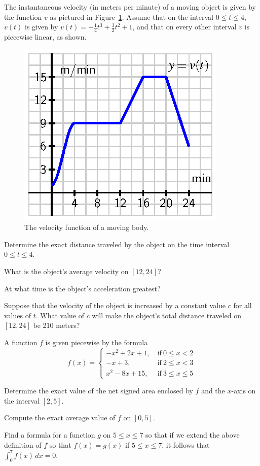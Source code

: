 \begin{exercises} 
  \item The instantaneous velocity (in meters per minute) of a moving object is given by the function $v$ as pictured in Figure~\ref{F:4.4.Ez2}.  Assume that on the interval $0 \le t \le 4$, $v(t)$ is given by $v(t) = -\frac{1}{4}t^3 + \frac{3}{2}t^2 + 1$, and that on every other interval $v$ is piecewise linear, as shown.
  \begin{figure}[h]
\begin{center}
\includegraphics{figures/4_4_Ez2.eps}
\caption{The velocity function of a moving body.} \label{F:4.4.Ez2}
\end{center}
\end{figure} 
  \ba
  	\item Determine the exact distance traveled by the object on the time interval $0 \le t \le 4$.
	\item What is the object's average velocity on $[12,24]$?
	\item At what time is the object's acceleration greatest?
	\item Suppose that the velocity of the object is increased by a constant value $c$ for all values of $t$.  What value of $c$ will make the object's total distance traveled on $[12,24]$ be 210 meters?
  \ea
    \item A function $f$ is given piecewise by the formula
  $$f(x) = \left\{ 
  	\begin{array}{lr}
	-x^2 + 2x + 1, & \ \mbox{if} \ 0 \le x < 2 \\
	-x + 3, & \ \mbox{if} \ 2 \le x < 3 \\
	x^2 - 8x + 15, & \ \mbox{if} \ 3 \le x \le 5
	\end{array}
	\right.
  $$
  \ba
  	\item Determine the exact value of the net signed area enclosed by $f$ and the $x$-axis on the interval $[2,5]$.
	\item Compute the exact average value of $f$ on $[0,5]$.
	\item Find a formula for a function $g$ on $5 \le x \le 7$ so that if we extend the above definition of $f$ so that $f(x) = g(x)$ if $5 \le x \le 7$, it follows that $\int_0^7 f(x) \, dx = 0.$
  \ea


\end{exercises}
